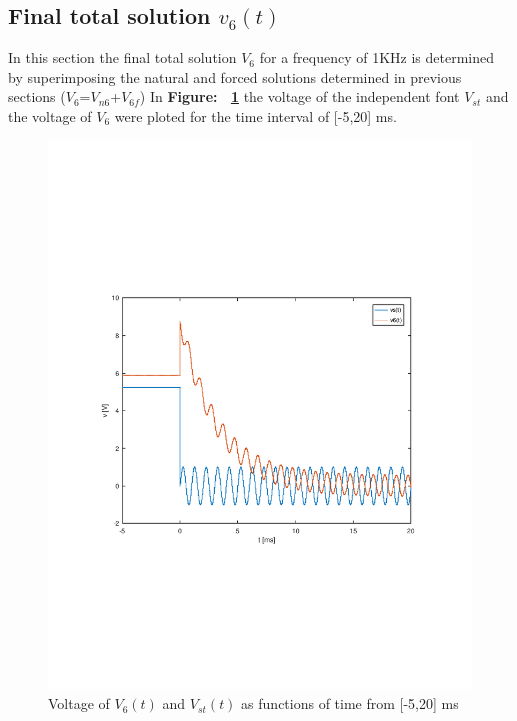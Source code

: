 \subsection{Final total solution $v_6(t)$}
In this section the final total solution $V_6$ for a frequency of 1KHz is determined by superimposing the natural and forced solutions determined in previous sections ($V_6$=$V_{n6}$+$V_{6f}$) In \textbf{Figure: ~\ref{fig:theo5}} the voltage of the independent font $V_{st}$ and the voltage of $V_{6}$ were ploted for the time interval of [-5,20] ms. 
\begin{figure}[h!] \centering
\includegraphics[width=0.9\linewidth]{theo5_tab.pdf}
\caption{Voltage of $V_{6}(t)$ and $V_{st}(t)$ as functions of time from [-5,20] ms}
\label{fig:theo5}
\end{figure}
\vspace{15cm}
\pagebreak


